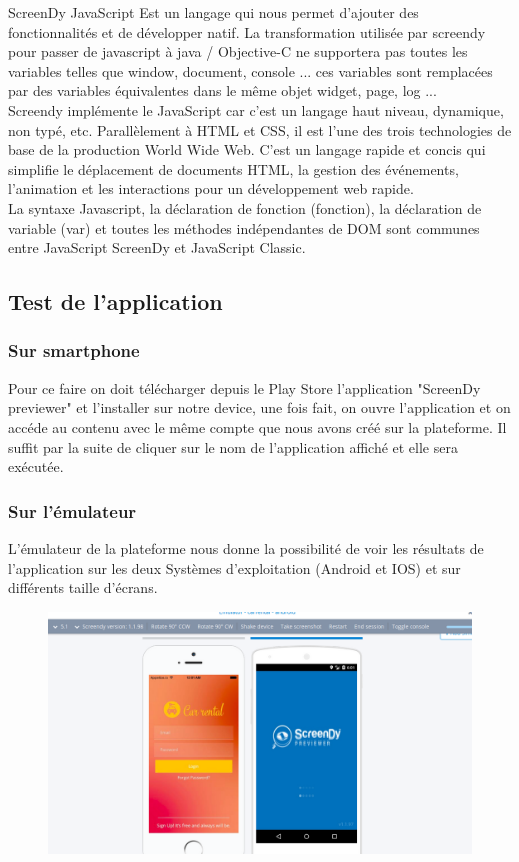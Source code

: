 \documentclass[12pt,a4paper]{report}
\begin{document}
ScreenDy JavaScript Est un langage qui nous permet d'ajouter des fonctionnalités et de développer natif. La transformation utilisée par screendy pour passer de javascript à java / Objective-C ne supportera pas toutes les variables telles que window, document, console ... ces variables sont remplacées par des variables équivalentes dans le même objet widget, page, log ...\\
Screendy implémente le JavaScript car c'est un langage haut niveau, dynamique, non typé, etc. Parallèlement à HTML et CSS, il est l'une des trois technologies de base de la production World Wide Web. C'est un langage rapide et concis qui simplifie le déplacement de documents HTML, la gestion des événements, l'animation et les interactions pour un développement web rapide.\\
La syntaxe Javascript, la déclaration de fonction (fonction), la déclaration de variable (var) et toutes les méthodes indépendantes de DOM sont communes entre JavaScript ScreenDy et JavaScript Classic.



		\subsection{Test de l'application}
			\subsubsection{Sur smartphone}
Pour ce faire on doit télécharger depuis le Play Store l'application "ScreenDy previewer" et l'installer sur notre device, une fois fait,  on ouvre l'application et on accéde au contenu avec le même compte que nous avons créé sur la plateforme. Il suffit par la suite de cliquer sur le nom de l'application affiché et elle sera exécutée.
			\subsubsection{Sur l'émulateur}
L'émulateur de la plateforme nous donne la possibilité de voir les résultats de l'application sur les deux Systèmes d'exploitation (Android et IOS) et sur différents taille d'écrans.
			\begin{figure}[!hbtp]
			\centering
			\includegraphics[scale=0.3]{./graphics/emul.png}
			\end{figure}
\end{document}
